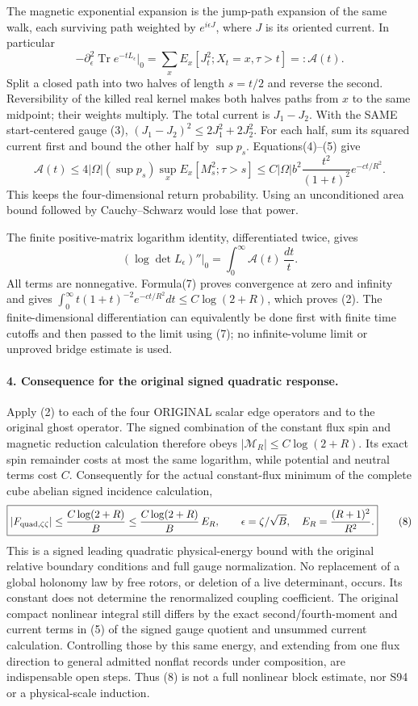 \documentclass[11pt]{article}
\begin{document}
The magnetic exponential expansion is the jump-path expansion of the
same walk, each surviving path weighted by $e^{i\epsilon J}$, where $J$
is its oriented current. In particular
\[
 -\partial_\epsilon^2\operatorname{Tr}e^{-tL_\epsilon}\big|_0
 =\sum_x E_x[J_t^2;X_t=x,\tau>t]=:\mathcal A(t).                  \tag{6}
\]
Split a closed path into two halves of length $s=t/2$ and reverse the
second. Reversibility of the killed real kernel makes both halves paths
from $x$ to the same midpoint; their weights multiply. The total current
is $J_1-J_2$. With the SAME start-centered gauge (3),
$(J_1-J_2)^2\le2J_1^2+2J_2^2$. For each half, sum its squared current
first and bound the other half by $\sup p_s$. Equations(4)--(5) give
\[
 \mathcal A(t)\le4|\Omega|(\sup p_s)\sup_xE_x[M_s^2;\tau>s]
 \le C|\Omega|b^2\frac{t^2}{(1+t)^2}e^{-ct/R^2}.                  \tag{7}
\]
This keeps the four-dimensional return probability. Using an unconditioned
area bound followed by Cauchy--Schwarz would lose that power.

The finite positive-matrix logarithm identity, differentiated twice, gives
\[
 (\log\det L_\epsilon)''\big|_0
 =\int_0^\infty\mathcal A(t)\,\frac{dt}{t}.
\]
All terms are nonnegative. Formula(7) proves convergence at zero and
infinity and gives
$\int_0^\infty t(1+t)^{-2}e^{-ct/R^2}dt\le C\log(2+R)$,
which proves (2). The finite-dimensional differentiation can equivalently
be done first with finite time cutoffs and then passed to the limit using
(7); no infinite-volume limit or unproved bridge estimate is used.

\paragraph{4. Consequence for the original signed quadratic response.}
Apply (2) to each of the four ORIGINAL scalar edge operators and to the
original ghost operator. The signed combination of the constant flux spin and magnetic reduction calculation therefore obeys
$|\mathcal M_R|\le C\log(2+R)$. Its exact spin remainder costs at most the
same logarithm, while potential and neutral terms cost $C$. Consequently
for the actual constant-flux minimum of the complete cube abelian signed incidence calculation,
\[
 \boxed{|F_{{\rm quad},\zeta\zeta}|
       \le {C\log(2+R)\over B}
       \le {C\log(2+R)\over B}\,E_R,\qquad
       \epsilon=\zeta/\sqrt B,\quad E_R={(R+1)^2\over R^2}.}         \tag{8}
\]
This is a signed leading quadratic physical-energy bound with the original
relative boundary conditions and full gauge normalization. No replacement
of a global holonomy law by free rotors, or deletion of a live determinant,
occurs. Its constant does not determine the renormalized coupling coefficient.
The original compact nonlinear integral still differs by the exact
second/fourth-moment and current terms in (5) of the signed gauge quotient and unsummed current calculation. Controlling those by
this same energy, and extending from one flux direction to general admitted
nonflat records under composition, are indispensable open steps. Thus (8)
is not a full nonlinear block estimate, nor S94 or a physical-scale induction.
\end{document}
